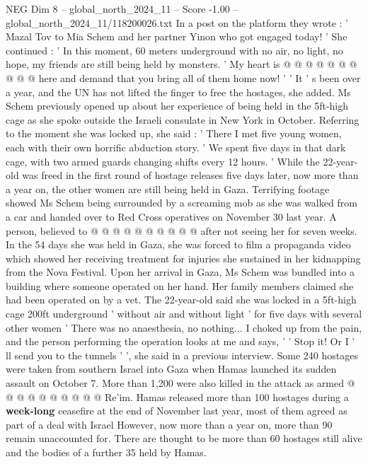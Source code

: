 \begin{textsample}{NEG Dim 8 – global\_north\_2024\_11 – Score -1.00 – global\_north\_2024\_11/118200026.txt}
In a post on the platform they wrote : ' Mazal Tov to Mia Schem and her partner Yinon who got engaged today! ' She continued : ' In this moment, 60 meters underground with no air, no light, no hope, my friends are still being held by monsters. ' My heart is @ @ @ @ @ @ @ @ @ @ here and demand that you bring all of them home now! ' ' It ' s been over a year, and the UN has not lifted the finger to free the hostages, she added.
Ms Schem previously opened up about her experience of being held in the 5ft-high cage as she spoke outside the Israeli consulate in New York in October.
Referring to the moment she was locked up, she said : ' There I met five young women, each with their own horrific abduction story. ' We spent five days in that dark cage, with two armed guards changing shifts every 12 hours. ' While the 22-year-old was freed in the first round of hostage releases five days later, now more than a year on, the other women are still being held in Gaza.
Terrifying footage showed Ms Schem being surrounded by a screaming mob as she was walked from a car and handed over to Red Cross operatives on November 30 last year.
A person, believed to @ @ @ @ @ @ @ @ @ @ after not seeing her for seven weeks.
In the 54 days she was held in Gaza, she was forced to film a propaganda video which showed her receiving treatment for injuries she sustained in her kidnapping from the Nova Festival.
Upon her arrival in Gaza, Ms Schem was bundled into a building where someone operated on her hand.
Her family members claimed she had been operated on by a vet.
The 22-year-old said she was locked in a 5ft-high cage 200ft underground ' without air and without light ' for five days with several other women ' There was no anaesthesia, no nothing...
I choked up from the pain, and the person performing the operation looks at me and says, ' ' Stop it!
Or I ' ll send you to the tunnels ' ', she said in a previous interview.
Some 240 hostages were taken from southern Israel into Gaza when Hamas launched its sudden assault on October 7.
More than 1,200 were also killed in the attack as armed @ @ @ @ @ @ @ @ @ @ Re'im.
Hamas released more than 100 hostages during a \textbf{week-long} ceasefire at the end of November last year, most of them agreed as part of a deal with Israel However, now more than a year on, more than 90 remain unaccounted for.
There are thought to be more than 60 hostages still alive and the bodies of a further 35 held by Hamas.

\end{textsample}
